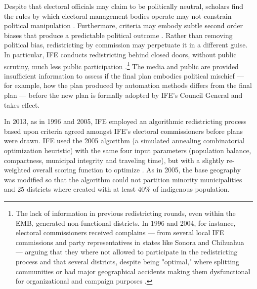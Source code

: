 \documentclass[letter,12pt]{article}
\begin{document}
Despite that electoral officials may claim to be politically neutral, scholars find the rules by which electoral management bodies operate may not constrain political manipulation \citep{lijphart.1990,rossiter.etal.1997,estevez.magar.rosas.2008}. Furthermore, criteria may embody subtle second order biases that produce a predictable political outcome \citep{parker.1990}. Rather than removing political bias, redistricting by commission may perpetuate it in a different guise. In particular, IFE conducts redistricting behind closed doors, without public scrutiny, much less public participation \citep{trelles.mtz.tesisItam.2007}.\footnote{The lack of information in previous redistricting rounds, even within the EMB, generated non-functional districts. In 1996 and 2004, for instance, electoral commissioners received complains --- from several local IFE commissions and party representatives in states like Sonora and Chihuahua --- arguing that they where not allowed to participate in the redistricting process and that several districts, despite being "optimal," where splitting communities or had major geographical accidents making them dysfunctional for organizational and campaign purposes \citep{trelles.mtz.tesisItam.2007}.} The media and public are provided insufficient information to assess if the final plan embodies political mischief --- for example, how the plan produced by automation methods differs from the final plan --- before the new plan is formally adopted by IFE's Council General and takes effect.


In 2013, as in 1996 and 2005, IFE employed an algorithmic redistricting process based upon criteria agreed amongst IFE's electoral commissioners before plans were drawn. IFE used the 2005 algorithm (a simulated annealing combinatorial optimization heuristic) with the same four input parameters (population balance, compactness, municipal integrity and traveling time), but with a slightly re-weighted overall scoring function to optimize \citep{trelles.mtz.tesisItam.2007,acuerdoife2013}. As in 2005, the base geography was modified so that the algorithm could not partition minority municipalities and 25 districts where created with at least 40\% of indigenous population. 
\end{document}
